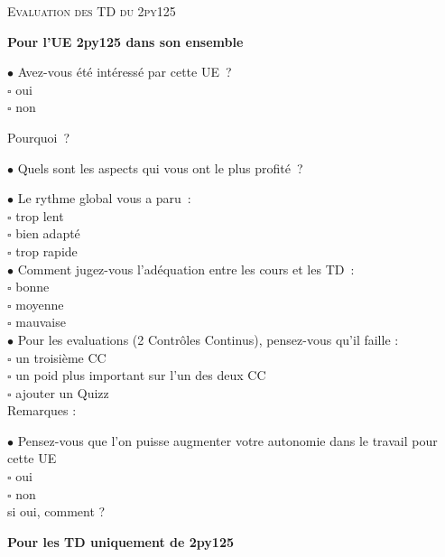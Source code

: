 \documentclass[10pt]{letter}
\begin{document}
\begin{center}
\textsc{Evaluation des TD du 2py125}
\end{center}

\bigskip

{\bf Pour l'UE 2py125 dans son ensemble}

$\bullet$ Avez-vous été intéressé par cette UE ? \\
$\square$ oui \\
$\square$ non

Pourquoi ? \\
\vspace{1.0cm}


$\bullet$ Quels sont les aspects qui vous ont le plus profité ? \\
\vspace{1.0cm}


$\bullet$ Le rythme global vous a paru : \\
$\square$ trop lent \\
$\square$ bien adapté \\
$\square$ trop rapide \\


$\bullet$ Comment jugez-vous l’adéquation entre les cours et les TD : \\
$\square$ bonne \\
$\square$ moyenne \\
$\square$ mauvaise \\


$\bullet$ Pour les evaluations (2 Contrôles Continus), pensez-vous qu'il faille : \\
$\square$ un troisième CC \\
$\square$ un poid plus important sur l'un des deux CC \\
$\square$ ajouter un Quizz \\
Remarques : \\
\vspace{1.0cm}


$\bullet$ Pensez-vous que l'on puisse augmenter votre autonomie dans le travail pour cette UE \\
$\square$ oui \\
$\square$ non \\
si oui, comment ?
\vspace{1.0cm}

\newpage

{\bf Pour les TD uniquement de 2py125}
\end{document}
